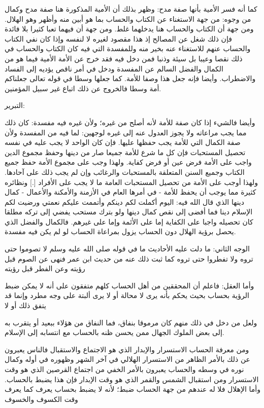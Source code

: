 كما أنه فسر الأمية بأنها صفة مدح: 
وظهر بذلك أن الأمية المذكورة هنا صفة مدح وكمال من وجوه: من جهة الاستغناء عن الكتاب والحساب بما هو أبين منه وأظهر وهو الهلال. ومن جهة أن الكتاب والحساب هنا يدخلهما غلط. ومن جهة أن فيهما تعبا كثيرا بلا فائدة فإن ذلك شغل عن المصالح إذ هذا مقصود لغيره لا لنفسه وإذا كان نفي الكتاب والحساب عنهم للاستغناء عنه بخير منه وللمفسدة التي فيه كان الكتاب والحساب في ذلك نقصا وعيبا بل سيئة وذنبا فمن دخل فيه فقد خرج عن الأمة الأمية فيما هو من الكمال والفضل السالم عن المفسدة ودخل في أمر ناقص يؤديه إلى الفساد والاضطراب. وأيضا فإنه جعل هذا وصفا للأمة. كما جعلها وسطا في قوله تعالى {جعلناكم أمة وسطا} فالخروج عن ذلك اتباع غير سبيل المؤمنين.

التبرير: 

وأيضا فالشيء إذا كان صفة للأمة لأنه أصلح من غيره؛ ولأن غيره فيه مفسدة: كان ذلك مما يجب مراعاته ولا يجوز العدول عنه إلى غيره لوجهين: لما فيه من المفسدة ولأن صفة الكمال التي للأمة يجب حفظها عليها. فإن كان الواحد لا يجب عليه في نفسه تحصيل المستحبات فإن كل ما شرع للأمة جميعا صار من دينها وحفظ مجموع الدين واجب على الأمة فرض عين أو فرض كفاية. ولهذا وجب على مجموع الأمة حفظ جميع الكتاب وجميع السنن المتعلقة بالمستحبات والرغائب وإن لم يجب ذلك على آحادها. ولهذا أوجب على الأمة من تحصيل المستحبات العامة ما لا يجب على الأفراد [.] ونظائره كثيرة مما يوجب أن يحفظ للأمة - في أمرها العام في الأزمنة والأمكنة والأعمال - كمال دينها الذي قال الله فيه: {اليوم أكملت لكم دينكم وأتممت عليكم نعمتي ورضيت لكم الإسلام دينا} فما أفضى إلى نقص كمال دينها ولو بترك مستحب يفضي إلى تركه مطلقا كان تحصيله واجبا على الكفاية إما على الأئمة وإما على غيرهم. فالكمال والفضل الذي يحصل برؤية الهلال دون الحساب يزول بمراعاة الحساب لو لم يكن فيه مفسدة.

الوجه الثاني: ما دلت عليه الأحاديث ما في قوله صلى الله عليه وسلم {لا تصوموا حتى تروه ولا تفطروا حتى تروه} كما ثبت ذلك عنه من حديث ابن عمر فنهى عن الصوم قبل رؤيته وعن الفطر قبل رؤيته

وأما العقل: فاعلم أن المحققين من أهل الحساب كلهم متفقون على أنه لا يمكن ضبط الرؤية بحساب بحيث يحكم بأنه يرى لا محالة أو لا يرى ألبتة على وجه مطرد وإنما قد يتفق ذلك أو لا 

ولعل من دخل في ذلك منهم كان مرموقا بنفاق، فما النفاق من هؤلاء ببعيد أو يتقرب به إلى بعض الملوك الجهال ممن يحسن ظنه بالحساب مع انتسابه إلى الإسلام.


ومن معرفة الحساب الاستسرار والإبدار الذي هو الاجتماع والاستقبال فالناس يعبرون عن ذلك بالأمر الظاهر من الاستسرار الهلالي في آخر الشهر وظهوره في أوله وكمال نوره في وسطه والحساب يعبرون بالأمر الخفي من اجتماع القرصين الذي هو وقت الاستسرار ومن استقبال الشمس والقمر الذي هو وقت الإبدار فإن هذا يضبط بالحساب. وأما الإهلال فلا له عندهم من جهة الحساب ضبط؛ لأنه لا يضبط بحساب يعرف كما يعرف وقت الكسوف والخسوف


